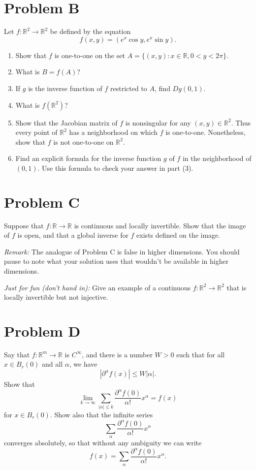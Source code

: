 \documentclass[lang=en,11pt]{template}
\begin{document}
\section*{Problem B}
Let $f : \mathbb{R}^2 \to \mathbb{R}^2$ be defined by the equation
\[
f(x, y) = (e^x \cos y, e^x \sin y).
\]
\begin{enumerate}
    \item Show that $f$ is one-to-one on the set $A = \{(x, y) : x \in \mathbb{R}, 0 < y < 2\pi\}$.
    \item What is $B = f(A)$?
    \item If $g$ is the inverse function of $f$ restricted to $A$, find $Dg(0, 1)$.
    \item What is $f(\mathbb{R}^2)$?
    \item Show that the Jacobian matrix of $f$ is nonsingular for any $(x, y) \in \mathbb{R}^2$. Thus every point of $\mathbb{R}^2$ has a neighborhood on which $f$ is one-to-one. Nonetheless, show that $f$ is not one-to-one on $\mathbb{R}^2$.
    \item Find an explicit formula for the inverse function $g$ of $f$ in the neighborhood of $(0, 1)$. Use this formula to check your answer in part (3).
\end{enumerate}


\section*{Problem C}
Suppose that $f : \mathbb{R} \to \mathbb{R}$ is continuous and locally invertible. Show that the image of $f$ is open, and that a global inverse for $f$ exists defined on the image.

\textit{Remark:} The analogue of Problem C is false in higher dimensions. You should pause to note what your solution uses that wouldn’t be available in higher dimensions.

\textit{Just for fun (don’t hand in):} Give an example of a continuous $f : \mathbb{R}^2 \to \mathbb{R}^2$ that is locally invertible but not injective.

\section*{Problem D}
Say that $f : \mathbb{R}^m \to \mathbb{R}$ is $C^\infty$, and there is a number $W > 0$ such that for all $x \in B_r(0)$ and all $\alpha$, we have
\[
|\partial^\alpha f(x)| \leq W |\alpha|.
\]
Show that
\[
\lim_{k \to \infty} \sum_{|\alpha| \leq k} \frac{\partial^\alpha f(0)}{\alpha!} x^\alpha = f(x)
\]
for $x \in B_r(0)$. Show also that the infinite series
\[
\sum_{\alpha} \frac{\partial^\alpha f(0)}{\alpha!} x^\alpha
\]
converges absolutely, so that without any ambiguity we can write
\[
f(x) = \sum_{\alpha} \frac{\partial^\alpha f(0)}{\alpha!} x^\alpha.
\]
\end{document}
